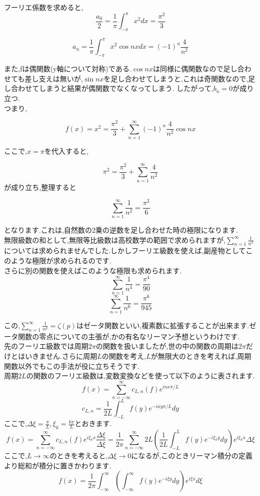 フーリエ係数を求めると,
\[
  \frac{a_0}{2} = \frac{1}{\pi} \int_{-\pi}^\pi x^2 dx = \frac{\pi^2}{3}
\]

\[
  a_n = \frac{1}{\pi} \int_{-\pi}^\pi x^2 \cos nx dx = (-1)^n \frac{4}{n^2}
\]

また,fは偶関数(y軸について対称)である.$\cos nx$は同様に偶関数なので足し合わせても差し支えは無いが,$\sin nx$を足し合わせてしまうと,これは奇関数なので,足し合わせてしまうと結果が偶関数でなくなってしまう.
したがって,$b_n = 0$が成り立つ.\\
つまり,

\[
  f(x) = x^2 = \frac{\pi^2}{3} + \sum_{n=1}^\infty (-1)^n \frac{4}{n^2} \cos nx
\]

ここで,$x = \pi$を代入すると,

\[
  \pi^2 = \frac{\pi^2}{3} + \sum_{n=1}^\infty \frac{4}{n^2}
\]
が成り立ち,整理すると

\[
  \sum_{n=1}^\infty \frac{1}{n^2} = \frac{\pi^2}{6}
\]

となります.これは,自然数の2乗の逆数を足し合わせた時の極限になります.\\

無限級数の和として,無限等比級数は高校数学の範囲で求められますが,$\sum_{n=1}^\infty \frac{1}{n^2}$については求められませんでした.しかしフーリエ級数を使えば,副産物としてこのような極限が求められるのです.\\
さらに別の関数を使えばこのような極限も求められます.
\[
  \sum_{n=1}^\infty \frac{1}{n^4} = \frac{\pi^4}{90}
\]
\[
  \sum_{n=1}^\infty \frac{1}{n^6} = \frac{\pi^6}{945}
\]

この,$\sum_{n=1}^\infty \frac{1}{n^p} = \zeta(p)$はゼータ関数といい,複素数に拡張することが出来ます.ゼータ関数の零点についての主張が,かの有名なリーマン予想というわけです.\\


先のフーリエ級数では周期$2\pi$の関数を扱いましたが,世の中の関数の周期は$2\pi$だけとはいきません.さらに周期$L$の関数を考え,$L$が無限大のときを考えれば,周期関数以外でもこの手法が役に立ちそうです.\\
周期$2L$の関数のフーリエ級数は,変数変換などを使って以下のように表されます.
\[
  f(x) = \sum_{n=-\infty}^\infty c_{L,n}(f) e^{inx\pi/L}
\]
\[
  c_{L,n} = \frac{1}{2L} \int_{-L}^L f(y) e^{-iny\pi/L} dy
\]
ここで,$\Delta\xi = \frac{\pi}{L},{\xi_k} = \frac{k\pi}{L}$とおきます.
\[
  f(x) = \sum_{n=-\infty}^\infty c_{L,n}(f) e^{i{\xi_k}x} \frac{\Delta\xi}{\Delta\xi}
  =\frac{1}{2\pi} \sum_{n=-\infty}^\infty 2{L}(\frac{1}{2L} \int_{-L}^L f(y) e^{-i{\xi_k}y} dy) e^{i{\xi_k}x} {\Delta\xi}
\]
ここで,$L \to \infty$のときを考えると,${\Delta\xi} \to 0$になるが,このときリーマン積分の定義より総和が積分に置きかわります.
\[
  f(x) = \frac{1}{2\pi} \int_{-\infty}^\infty (\int_{-\infty}^\infty f(y) e^{-i\xi y}dy) e^{i\xi x}d\xi
\]

